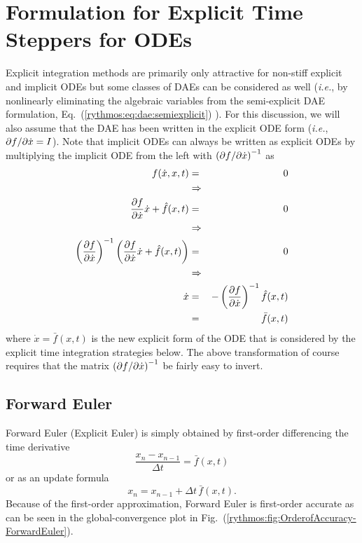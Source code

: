 
\section{Formulation for Explicit Time Steppers for ODEs}

Explicit integration methods are primarily only attractive for non-stiff
explicit and implicit ODEs but some classes of DAEs can be considered
as well (\emph{i.e.}, by nonlinearly eliminating the algebraic variables
from the semi-explicit DAE formulation, Eq.~(\ref{rythmos:eq:dae:semiexplicit})
\cite{BCP}). For this discussion, we will also assume that the DAE
has been written in the explicit ODE form (\emph{i.e.}, $\partial f / \partial \dot{x}=I$).
Note that implicit ODEs can always be written as explicit ODEs by
multiplying the implicit ODE from the left with $\left(\partial f / \partial \dot{x}\right)^{-1}$
as
\begin{eqnarray*}
f(\dot{x},x,t) & = & 0\\
 & \Rightarrow\\
\displaystyle{\frac{\partial f}{\partial \dot{x}}}\dot{x}+\hat{f}(x,t) & = & 0\\
 & \Rightarrow\\
\left(\displaystyle{\frac{\partial f}{\partial \dot{x}}}\right)^{-1}\left(\displaystyle{\frac{\partial f}{\partial \dot{x}}}\dot{x}+\hat{f}(x,t)\right) & = & 0\\
 & \Rightarrow\\
\dot{x} & = & -\left(\displaystyle{\frac{\partial f}{\partial \dot{x}}}\right)^{-1}\hat{f}(x,t)\\
 & = & \bar{f}(x,t)
\end{eqnarray*}
where $\dot{x}=\bar{f}(x,t)$ is the new explicit form of the ODE
that is considered by the explicit time integration strategies below.
The above transformation of course requires that the matrix $\left(\partial f / \partial \dot{x}\right)^{-1}$
be fairly easy to invert.


\subsection{Forward Euler\label{rythmos:sec:Forward-Euler}}

Forward Euler (Explicit Euler) is simply obtained by first-order differencing
the time derivative
\[
\frac{x_{n}-x_{n-1}}{\Delta t}=\bar{f}(x,t)
\]
or as an update formula
\[
x_{n}=x_{n-1}+\Delta t\,\bar{f}(x,t).
\]
Because of the first-order approximation, Forward Euler is first-order
accurate as can be seen in the global-convergence plot in Fig.~(\ref{rythmos:fig:OrderofAccuracy-ForwardEuler}).

